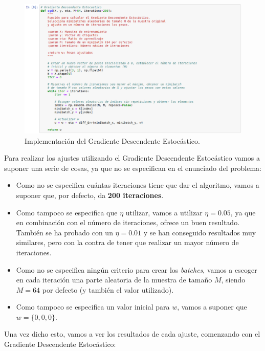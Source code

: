 \documentclass[11pt,a4paper]{article}
\begin{document}
\begin{figure}[H]
\centering
\includegraphics[scale=0.4]{img/sgd.png}
\caption{Implementación del Gradiente Descendente Estocástico.}
\end{figure}

Para realizar los ajustes utilizando el Gradiente Descendente Estocástico vamos a suponer una serie de cosas, ya que no
se especifican en el enunciado del problema:

\begin{itemize}[label=\textbullet]
	\item Como no se especifica cuántas iteraciones tiene que dar el algoritmo, vamos a suponer que, por defecto, da
	\textbf{200 iteraciones}.
	\item Como tampoco se especifica que $\eta$ utilizar, vamos a utilizar $\eta = 0.05$, ya que en combinación con el
	número de iteraciones, ofrece un buen resultado. También se ha probado con un $\eta = 0.01$ y se han conseguido
	resultados muy similares, pero con la contra de tener que realizar un mayor número de iteraciones.
	\item Como no se especifica ningún criterio para crear los \textit{batches}, vamos a escoger en cada iteración una
	parte aleatoria de la muestra de tamaño $M$, siendo $M = 64$ por defecto (y también el valor utilizado).
	\item Como tampoco se especifica un valor inicial para $w$, vamos a suponer que $w = \lbrace 0, 0, 0 \rbrace$.
\end{itemize}

Una vez dicho esto, vamos a ver los resultados de cada ajuste, comenzando con el Gradiente Descendente Estocástico:
\end{document}
